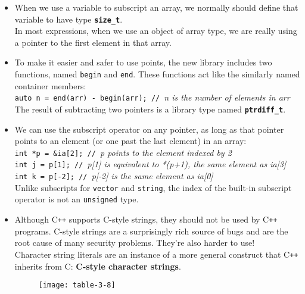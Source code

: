 \begin{itemize}
\item
When we use a variable to subscript an array, we normally should define that variable to have type \textbf{\texttt{size\_t}}.\\
In most expressions, when we use an object of array type, we are really using a pointer to the first element in that array.

\item
To make it easier and safer to use points, the new library includes two functions, named \texttt{begin} and \texttt{end}. These functions act like the similarly named container members:\\
\hspace*{1em}\texttt{auto n = end(arr) - begin(arr); // }\textit{n is the number of elements in arr}\\
The result of subtracting two pointers is a library type named \textbf{\texttt{ptrdiff\_t}}.

\item
We can use the subscript operator on any pointer, as long as that pointer points to an element (or one past the last element) in an array:\\
\hspace*{1em}\texttt{int *p = \&ia[2]; // }\textit{p points to the element indexed by 2}\\
\hspace*{1em}\texttt{int j = p[1]; // }\textit{p[1] is equivalent to *(p+1), the same element as ia[3]}\\
\hspace*{1em}\texttt{int k = p[-2]; // }\textit{p[-2] is the same element as ia[0]}\\
Unlike subscripts for \texttt{vector} and \texttt{string}, the index of the built-in subscript operator is not an \texttt{unsigned} type.

\item
Although C\texttt{++} supports C-style strings, they should not be used by C\texttt{++} programs. C-style strings are a surprisingly rich source of bugs and are the root cause of many security problems. They're also harder to use!\\
Character string literals are an instance of a more general construct that C\texttt{++} inherits from C: \textbf{C-style character strings}.

\begin{figure}[ht]
\texttt{[image: table-3-8]}
\centering
\end{figure}


\end{itemize}
